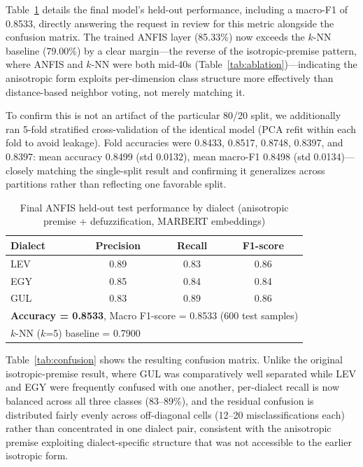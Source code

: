 \documentclass[conference]{IEEEtran}
\begin{document}
Table~\ref{tab:anfis} details the final model's held-out performance, including a macro-F1 of 0.8533, directly answering the request in review for this metric alongside the confusion matrix. The trained ANFIS layer (85.33\%) now exceeds the $k$-NN baseline (79.00\%) by a clear margin---the reverse of the isotropic-premise pattern, where ANFIS and $k$-NN were both mid-40s (Table~\ref{tab:ablation})---indicating the anisotropic form exploits per-dimension class structure more effectively than distance-based neighbor voting, not merely matching it.

To confirm this is not an artifact of the particular 80/20 split, we additionally ran 5-fold stratified cross-validation of the identical model (PCA refit within each fold to avoid leakage). Fold accuracies were 0.8433, 0.8517, 0.8748, 0.8397, and 0.8397: mean accuracy 0.8499 (std 0.0132), mean macro-F1 0.8498 (std 0.0134)---closely matching the single-split result and confirming it generalizes across partitions rather than reflecting one favorable split.

\begin{table}[t]
\centering
\caption{Final ANFIS held-out test performance by dialect (anisotropic premise + defuzzification, MARBERT embeddings)}
\label{tab:anfis}
\begin{tabular}{lccc}
\toprule
Dialect & Precision & Recall & F1-score \\
\midrule
LEV & 0.89 & 0.83 & 0.86 \\
EGY & 0.85 & 0.84 & 0.84 \\
GUL & 0.83 & 0.89 & 0.86 \\
\midrule
\multicolumn{4}{l}{\textbf{Accuracy = 0.8533}, Macro F1-score = 0.8533 (600 test samples)} \\
\multicolumn{4}{l}{$k$-NN ($k$=5) baseline = 0.7900} \\
\bottomrule
\end{tabular}
\end{table}

Table~\ref{tab:confusion} shows the resulting confusion matrix. Unlike the original isotropic-premise result, where GUL was comparatively well separated while LEV and EGY were frequently confused with one another, per-dialect recall is now balanced across all three classes (83--89\%), and the residual confusion is distributed fairly evenly across off-diagonal cells (12--20 misclassifications each) rather than concentrated in one dialect pair, consistent with the anisotropic premise exploiting dialect-specific structure that was not accessible to the earlier isotropic form.
\end{document}
